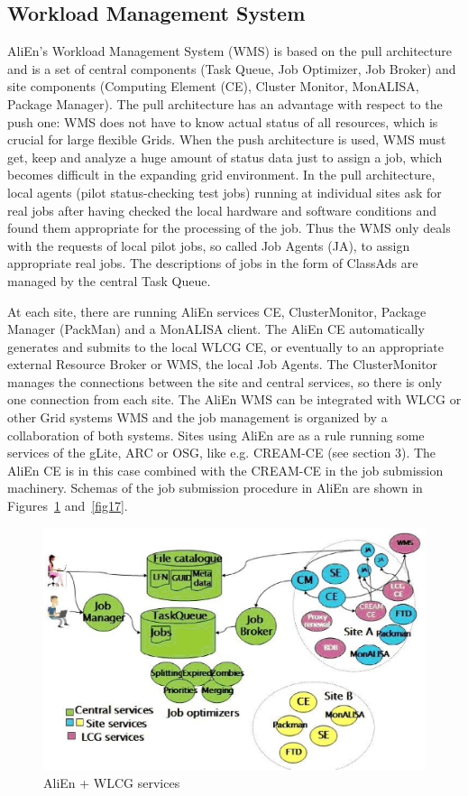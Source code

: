 \documentclass{intech}
\begin{document}
\subsection{Workload Management System}
%
AliEn's Workload Management System (WMS) is based on the pull
architecture and is a set of central components (Task Queue, Job
Optimizer, Job Broker) and site components (Computing Element (CE),
Cluster Monitor, MonALISA, Package Manager). The pull architecture
has an advantage with respect to the push one: WMS does not have to
know actual status of all resources, which is crucial for large
flexible Grids. When the push architecture is used, WMS must get,
keep and analyze a huge amount of status data just to assign a job,
which becomes difficult in the expanding grid environment. In the
pull architecture, local agents (pilot status-checking test jobs)
running at individual sites ask for  real jobs after having checked
the local hardware and software conditions and found them
appropriate for the processing of the job. Thus the WMS only deals
with the requests of local pilot jobs, so called Job Agents (JA), to
assign appropriate real jobs. The descriptions of jobs in the form
of ClassAds are managed by the central Task Queue.

At each site, there are running AliEn services CE, ClusterMonitor,
Package Manager (PackMan) and a MonALISA client. The AliEn CE
automatically generates and submits to the local WLCG CE, or
eventually to an appropriate external Resource Broker or WMS, the
local Job Agents. The ClusterMonitor manages the connections between
the site and central services, so there is only one connection from
each site. The AliEn WMS can be integrated with WLCG or other Grid
systems WMS and the job management is organized by a collaboration
of both systems. Sites using AliEn are as a rule running some
services of the gLite, ARC or OSG, like e.g. CREAM-CE (see section
3).  The AliEn CE is in this case combined with the CREAM-CE in the
job submission machinery. Schemas of the job submission procedure in
AliEn are shown in Figures~\ref{fig16} and~\ref{fig17}.

\begin{figure}[htb] %
\centering
\includegraphics[width=13cm]{fig16.eps} %
\caption{AliEn + WLCG services}\label{fig16}
\end{figure}
\end{document}
